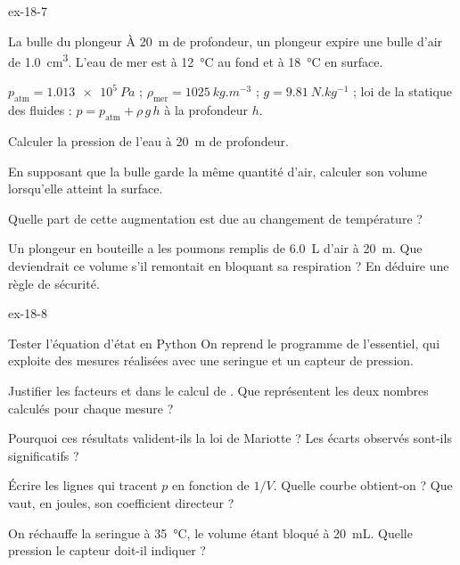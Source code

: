 \begin{blocLivre}{ex-18-7}
\begin{exercice}[2]{La bulle du plongeur}
À \qty{20}{m} de profondeur, un plongeur expire une bulle d'air de \qty{1,0}{cm^3}. L'eau de mer est à \qty{12}{\degreeCelsius}
au fond et à \qty{18}{\degreeCelsius} en surface.
\begin{donnees}
$p_\mathrm{atm}=\qty{1,013e5}{Pa}$ ; $\rho_\mathrm{mer}=\qty{1025}{kg.m^{-3}}$ ; $g=\qty{9,81}{N.kg^{-1}}$ ; loi de la statique des
fluides : $p=p_\mathrm{atm}+\rho\,g\,h$ à la profondeur $h$.
\end{donnees}
\begin{questions}
\item Calculer la pression de l'eau à \qty{20}{m} de profondeur.
\item En supposant que la bulle garde la même quantité d'air, calculer son volume lorsqu'elle atteint la surface.
\item Quelle part de cette augmentation est due au changement de température ?
\item Un plongeur en bouteille a les poumons remplis de \qty{6,0}{L} d'air à \qty{20}{m}. Que deviendrait ce volume s'il
remontait en bloquant sa respiration ? En déduire une règle de sécurité.
\end{questions}
\end{exercice}
\end{blocLivre}
\begin{blocLivre}{ex-18-8}
\begin{exercice}[2]{Tester l'équation d'état en Python}
On reprend le programme de l'essentiel, qui exploite des mesures réalisées avec une seringue et un capteur de pression.
\begin{questions}
\item {}Justifier les facteurs  et  dans le calcul de . Que
représentent les deux nombres calculés pour chaque mesure ?
\item Pourquoi ces résultats valident-ils la loi de Mariotte ? Les écarts observés sont-ils significatifs ?
\item Écrire les lignes qui tracent $p$ en fonction de $1/V$. Quelle courbe obtient-on ? Que vaut, en joules, son
coefficient directeur ?
\item On réchauffe la seringue à \qty{35}{\degreeCelsius}, le volume étant bloqué à \qty{20}{mL}. Quelle pression le capteur
doit-il indiquer ?
\end{questions}
\end{exercice}
\end{blocLivre}
